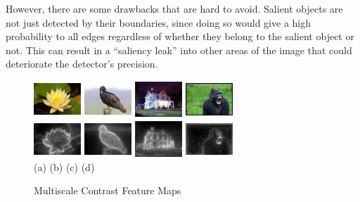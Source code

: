\documentclass[10pt,twocolumn,letterpaper]{article}
\newcommand{\hs}{\hspace{0.58in}}
\begin{document}
However, there are some drawbacks that are hard to avoid. Salient objects are not just detected by their boundaries, since doing so would give a high probability to all edges regardless of whether they belong to the salient object or not.  This can result in a ``saliency leak'' into other areas of the image that could deteriorate the detector's precision.



\begin{figure}[t]
    \begin{center}
    \includegraphics[width=0.7in,height=0.54in]{./Figures/contrast/1orig.jpg}
    \includegraphics[width=0.7in,height=0.54in]{./Figures/contrast/2orig.jpg}
    \includegraphics[width=0.7in,height=0.54in]{./Figures/contrast/3orig.jpg}
    \includegraphics[width=0.7in,height=0.54in]{./Figures/contrast/4orig.jpg}\\
    \includegraphics[width=0.7in,height=0.54in]{./Figures/contrast/1cont.jpg}
    \includegraphics[width=0.7in,height=0.54in]{./Figures/contrast/2cont.jpg}
    \includegraphics[width=0.7in,height=0.54in]{./Figures/contrast/3cont.jpg}
    \includegraphics[width=0.7in,height=0.54in]{./Figures/contrast/4cont.jpg}\\
    \footnotesize \hspace{0.1cm} (a) \hs (b) \hs  (c) \hs (d) \\
\caption{Multiscale Contrast Feature Maps} \label{Fig:LocalFeatureMap}
    \end{center}
\end{figure}
\end{document}
